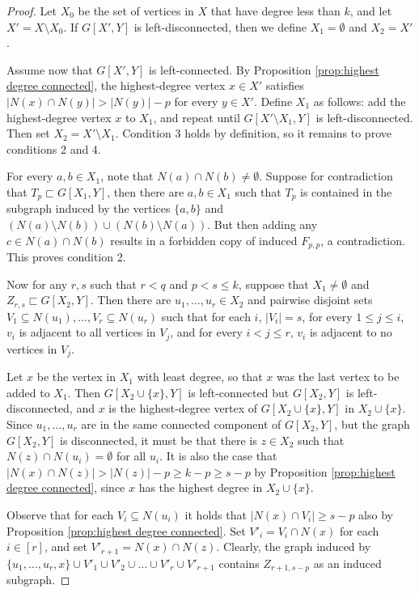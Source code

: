 \documentclass{theoretics}
\begin{document}
\begin{proof}
	Let $X_0$ be the set of vertices in $X$ that have degree less than $k$,
	and let $X' = X \setminus X_0$. If $G[X', Y]$ is left-disconnected, then we define
	$X_1 = \emptyset$ and $X_2 = X'$.
	
	Assume now that $G[X', Y]$ is left-connected. By Proposition \ref{prop:highest degree connected}, the highest-degree vertex $x \in X'$ satisfies $|N(x) \cap N(y)| > |N(y)|-p$ for every $y \in X'$. Define $X_1$ as follows: add the highest-degree vertex $x$ to $X_1$, and repeat until $G[X' \setminus X_1,Y]$ is left-disconnected. Then set $X_2 = X' \setminus X_1$.  Condition 3 holds by definition, so it remains to prove conditions 2 and 4.

	For every $a,b \in X_1$, note that $N(a) \cap N(b) \neq \emptyset$. Suppose for contradiction that
	$T_p \sqsubset G[X_1,Y]$, then there are $a,b \in X_1$ such that $T_p$ is contained in the subgraph induced by the vertices $\{a,b\}$ and $(N(a) \setminus N(b)) \cup (N(b) \setminus N(a))$.  But then adding any $c \in N(a) \cap N(b)$ results in a forbidden copy of induced $F_{p,p}$, a contradiction. This proves condition 2.


Now for any $r, s$ such that $r < q$ and $p < s \leq k$, suppose that $X_1 \neq \emptyset$ and $Z_{r,s} \sqsubset G[X_2,Y]$. Then there are $u_1, \dotsc, u_r \in X_2$ and pairwise disjoint sets $V_1 \subseteq N(u_1), \dotsc, V_r \subseteq N(u_r)$ such that for
each $i$, $|V_i| = s$, for every $1 \leq j \leq i$, $v_i$ is adjacent to all vertices in $V_j$, and
for every $i < j \leq r$, $v_i$ is adjacent to no vertices in $V_j$.

Let $x$ be the vertex in $X_1$ with least degree, so that $x$ was the last vertex to be added to
$X_1$. Then $G[X_2 \cup \{x\},Y]$ is left-connected but $G[X_2,Y]$ is left-disconnected, and $x$ is
the highest-degree vertex of $G[X_2 \cup \{x\},Y]$ in $X_2 \cup \{x\}$. Since $u_1, \dotsc, u_r$ are
in the same connected component of $G[X_2,Y]$, but the graph $G[X_2,Y]$ is disconnected, it must be that there is $z \in X_2$ such that $N(z) \cap N(u_i) = \emptyset$ for all $u_i$. 
It is also the case that $|N(x) \cap N(z)| > |N(z)|-p \geq k-p \geq s-p$ by Proposition \ref{prop:highest degree connected}, since $x$ has the highest degree in $X_2 \cup \{x\}$.

Observe that for each $V_i \subseteq N(u_i)$ it holds that $|N(x) \cap V_i| \geq s - p$ also by
Proposition \ref{prop:highest degree connected}. Set $V'_i = V_i \cap N(x)$ for each $i \in [r]$,
and set $V'_{r+1} = N(x) \cap N(z)$.
%
Clearly, the graph induced by
$\{u_1, \dotsc, u_r, x\} \cup V'_1 \cup V'_2 \cup \ldots \cup V'_r \cup V'_{r+1}$ contains 
$Z_{r+1,s-p}$ as an induced subgraph.
\end{proof}
\end{document}
